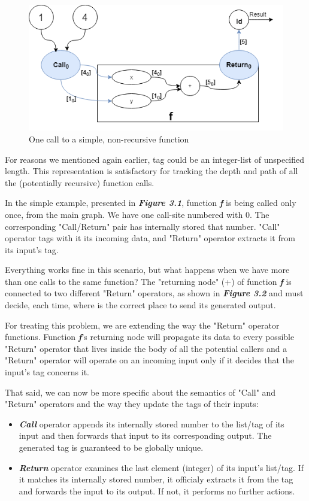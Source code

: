 \documentclass[ack,preface]{dithesis}
\begin{document}
\begin{figure}
\centering
\includegraphics[scale=0.65]{figures/Example1}
\caption{One call to a simple, non-recursive function}
\end{figure}

For reasons we mentioned again earlier, tag could be an integer-list of unspecified length. This representation is satisfactory for tracking the depth and path of all the (potentially recursive) function calls.

In the simple example, presented in \textit{\textbf{Figure 3.1}}, function \textit{\textbf{f}} is being called only once, from the main graph. We have one call-site numbered with 0. The corresponding "Call/Return" pair has internally stored that number. "Call" operator tags with it its incoming data, and "Return" operator extracts it from its input's tag. 

Everything works fine in this scenario, but what happens when we have more than one calls to the same function? 
The "returning node" (+) of function  \textit{\textbf{f}} is connected to  two different "Return" operators, as shown in \textit{\textbf{Figure 3.2}} and must decide, each time,  where is the correct place to send its generated output.

For treating this problem, we are extending the way the "Return" operator functions.  Function \textit{\textbf{f}}'s returning node will  propagate its data to every possible "Return" operator that lives inside the body of all the potential callers and a "Return" operator will operate on an incoming input only if it decides that the input's tag concerns it.

That said, we can now be more specific about the semantics of  "Call" and "Return" operators and the way they update the tags of their inputs:
    \begin{itemize}
    \item \textit{\textbf{Call }} operator appends its internally stored number to the list/tag of its input and then forwards that input to its corresponding output. The generated tag is guaranteed to be globally unique.
    \item \textit{\textbf{Return }} operator examines the last element (integer) of its input's list/tag. If it matches its internally stored number, it officialy extracts it from the tag and forwards the input to its output. If not,  it performs no further actions.
    \end{itemize}
\end{document}

